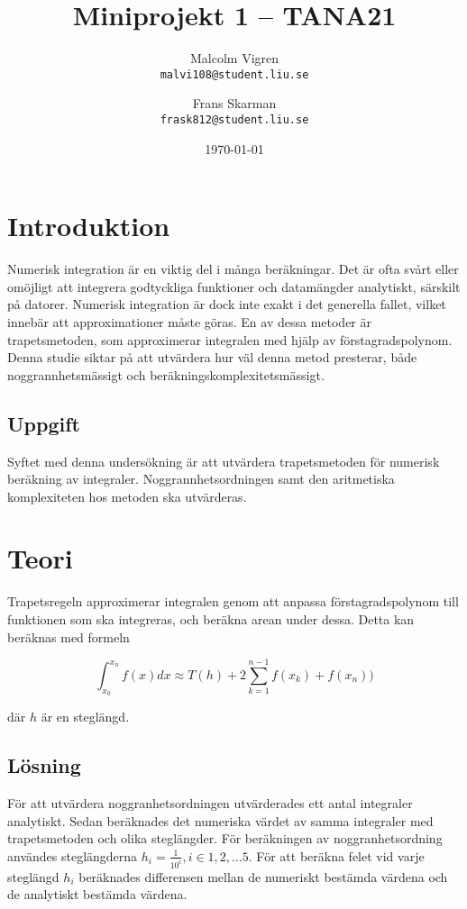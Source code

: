 \documentclass[a4paper,titlepage]{article}
\title{
    \textbf{Miniprojekt 1 -- TANA21}}
\date{\today}
\author{%
    Malcolm Vigren \\
    \texttt{malvi108@student.liu.se}
    \and
    Frans Skarman\\
    \texttt{frask812@student.liu.se}
    }
\begin{document}
\maketitle
\newpage
\tableofcontents
\newpage

\section{Introduktion}
Numerisk integration är en viktig del i många beräkningar. Det är ofta svårt
eller omöjligt att integrera godtyckliga funktioner och datamängder analytiskt,
särskilt på datorer. Numerisk integration är dock inte exakt i det generella
fallet, vilket innebär att approximationer måste göras. En av dessa metoder
är trapetsmetoden, som approximerar integralen med hjälp av förstagradspolynom.
Denna studie siktar på att utvärdera hur väl denna metod presterar,
både noggrannhetsmässigt och beräkningskomplexitetsmässigt.

\subsection{Uppgift}
Syftet med denna undersökning är att utvärdera trapetsmetoden för numerisk
beräkning av integraler. Noggrannhetsordningen samt den aritmetiska
komplexiteten hos metoden ska utvärderas.

\section{Teori}
Trapetsregeln approximerar integralen genom att anpassa förstagradspolynom till
funktionen som ska integreras, och beräkna arean under dessa. Detta kan
beräknas med formeln

\begin{equation}
    \int_{x_0}^{x_n}f(x)dx \approx T(h) +
    2\sum_{k=1}^{n-1}f(x_k) + f(x_n))
\end{equation}

där $h$ är en steglängd.

\subsection{Lösning}

För att utvärdera noggranhetsordningen utvärderades ett antal integraler
analytiskt. Sedan beräknades det numeriska värdet av samma integraler med
trapetsmetoden och olika steglängder. För beräkningen av noggranhetsordning
användes steglängderna $h_i = \frac{1}{10^i}, i \in {1,2, \dots 5}$.
För att beräkna felet vid varje steglängd $h_i$ beräknades differensen mellan de numeriskt
bestämda värdena och de analytiskt bestämda värdena.
\end{document}
